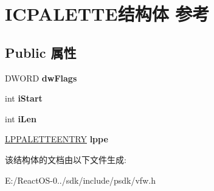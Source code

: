 \hypertarget{struct_i_c_p_a_l_e_t_t_e}{}\section{I\+C\+P\+A\+L\+E\+T\+T\+E结构体 参考}
\label{struct_i_c_p_a_l_e_t_t_e}
\subsection*{Public 属性}
\begin{DoxyCompactItemize}
\item 
\mbox{\label{struct_i_c_p_a_l_e_t_t_e_af40b43c82099adb383483e361854a36f}} 
D\+W\+O\+RD {\bfseries dw\+Flags}
\item 
\mbox{\label{struct_i_c_p_a_l_e_t_t_e_ae9c3628bdf817499b4563c9ff7e36f6b}} 
int {\bfseries i\+Start}
\item 
\mbox{\label{struct_i_c_p_a_l_e_t_t_e_a06716a519f9cb1ba7c7c33f97f4a65d3}} 
int {\bfseries i\+Len}
\item 
\mbox{\label{struct_i_c_p_a_l_e_t_t_e_ab26bc1e48628e991f8e3597a730b4897}} 
\hyperlink{structtag_p_a_l_e_t_t_e_e_n_t_r_y}{L\+P\+P\+A\+L\+E\+T\+T\+E\+E\+N\+T\+RY} {\bfseries lppe}
\end{DoxyCompactItemize}


该结构体的文档由以下文件生成\+:\begin{DoxyCompactItemize}
\item 
E\+:/\+React\+O\+S-\/0../sdk/include/psdk/vfw.\+h\end{DoxyCompactItemize}
